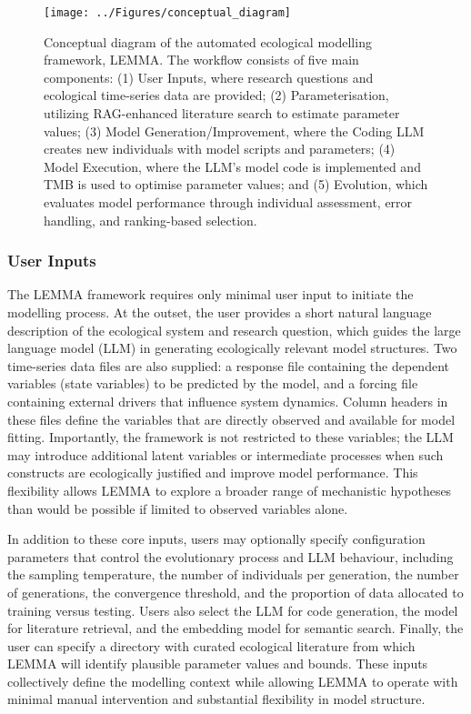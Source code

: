 \begin{landscape}
    \begin{figure}[p]
    \centering
    \texttt{[image: ../Figures/conceptual\_diagram]}
    \begingroup
    \small
    \caption{Conceptual diagram of the automated ecological modelling framework, LEMMA. The workflow consists of five main components: (1) User Inputs, where research questions and ecological time-series data are provided; (2) Parameterisation, utilizing RAG-enhanced literature search to estimate parameter values; (3) Model Generation/Improvement, where the Coding LLM creates new individuals with model scripts and parameters; (4) Model Execution, where the LLM's model code is implemented and TMB is used to optimise parameter values; and (5) Evolution, which evaluates model performance through individual assessment, error handling, and ranking-based selection.}
    \label{fig:conceptual}
    \endgroup
    \end{figure}
    \end{landscape}

\subsubsection{User Inputs}

The LEMMA framework requires only minimal user input to initiate the modelling process. At the outset, the user provides a short natural language description of the ecological system and research question, which guides the large language model (LLM) in generating ecologically relevant model structures. Two time-series data files are also supplied: a response file containing the dependent variables (state variables) to be predicted by the model, and a forcing file containing external drivers that influence system dynamics. Column headers in these files define the variables that are directly observed and available for model fitting. Importantly, the framework is not restricted to these variables; the LLM may introduce additional latent variables or intermediate processes when such constructs are ecologically justified and improve model performance. This flexibility allows LEMMA to explore a broader range of mechanistic hypotheses than would be possible if limited to observed variables alone.

In addition to these core inputs, users may optionally specify configuration parameters that control the evolutionary process and LLM behaviour, including the sampling temperature, the number of individuals per generation, the number of generations, the convergence threshold, and the proportion of data allocated to training versus testing. Users also select the LLM for code generation, the model for literature retrieval, and the embedding model for semantic search. Finally, the user can specify a directory with curated ecological literature from which LEMMA will identify plausible parameter values and bounds. These inputs collectively define the modelling context while allowing LEMMA to operate with minimal manual intervention and substantial flexibility in model structure.

